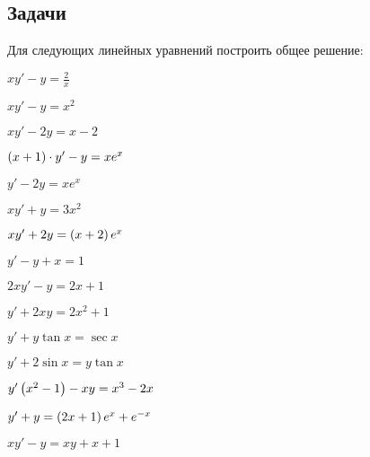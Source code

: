 \subsection{Задачи}
	
	Для следующих линейных уравнений построить общее решение:
	\begin{multicols}{3}
		\begin{enumtasks}

			\label{firstorder:linear}
			\item \( xy' - y = \frac{2}{x} \) 																%
			\item \( xy' - y = x^2 \) 																		%
			\item \( xy' - 2y = x - 2 \) 																	%
			\item \( \left( x + 1 \right) \cdot y' - y = x e^{x} \) 												%
			\item \( y' - 2y = x e^{x} \) 																	%
			\item \( xy' + y = 3x^2 \) 																		%
			\item \( xy' + 2y = \left( x + 2 \right) e^{x} \) 														%
			\item \( y' - y + x = 1 \) 																		%
			\item \( 2xy' - y = 2x + 1 \)																	%
			\item \( y' + 2xy = 2x^2 + 1 \) 																%
			\item \( y' + y \tan{x} = \sec{x} \) 															%
			\item \( y' + 2 \sin{x} = y \tan{x} \) 															%
			\item \( y' \left( x^2 - 1 \right) - xy = x^3 - 2x \) 													%
			\item \( y' + y = \left( 2x + 1 \right) e^{x} + e^{-x} \) 												%
			\item \( xy' - y = xy + x + 1 \) 																%

		\end{enumtasks}
	\end{multicols}

